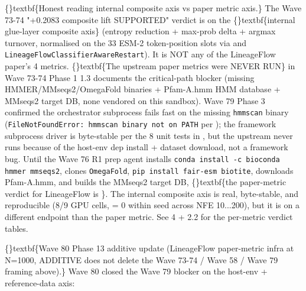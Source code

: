 \documentclass{article}
\begin{document}
\{\}textbf\{Honest reading  internal composite axis vs paper metric axis.\} The Wave 73-74 "+0.2083 composite lift SUPPORTED" verdict is on the \{\}textbf\{internal glue-layer composite axis\} (entropy reduction + max-prob delta + argmax turnover, normalised on the 33 ESM-2 token-position slots via  and \texttt{LineageFlowClassifierAwareRestart}). It is NOT any of the LineageFlow paper's 4 metrics. \{\}textbf\{The upstream paper metrics were NEVER RUN\} in Wave 73-74  Phase 1 1.3 documents the critical-path blocker (missing HMMER/MMseqs2/OmegaFold binaries + Pfam-A.hmm HMM database + MMseqs2 target DB, none vendored on this sandbox). Wave 79 Phase 3 confirmed the orchestrator subprocess fails fast on the missing \texttt{hmmscan} binary (\texttt{FileNotFoundError: hmmscan binary not on PATH} per ); the framework subprocess driver is byte-stable per the 8 unit tests in , but the upstream  never runs because of the host-env dep install + dataset download, not a framework bug. Until the Wave 76 R1 prep agent installs \texttt{conda install -c bioconda hmmer mmseqs2}, clones \texttt{OmegaFold}, \texttt{pip install fair-esm biotite}, downloads Pfam-A.hmm, and builds the MMseqs2 target DB, \{\}textbf\{the paper-metric verdict for LineageFlow is \}. The internal composite axis is real, byte-stable, and reproducible (8/9 GPU cells,  = 0 within seed across NFE 10...200), but it is on a different endpoint than the paper metric. See  4 +  2.2 for the per-metric verdict tables.

\{\}textbf\{Wave 80 Phase 13 additive update (LineageFlow paper-metric infra at N=1000, ADDITIVE  does not delete the Wave 73-74 / Wave 58 / Wave 79 framing above).\} Wave 80 closed the Wave 79  blocker on the host-env + reference-data axis:
\end{document}
